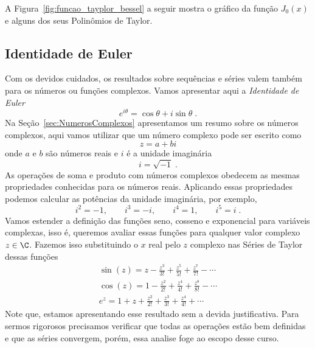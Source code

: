 A Figura~\ref{fig:funcao_tayplor_bessel} a seguir
mostra o gráfico da função $J_0(x)$ e alguns dos seus Polinômios de Taylor.

\subsection{Identidade de Euler}

Com os devidos cuidados, os resultados sobre sequências e séries
valem também para os números ou funções complexos. Vamos apresentar aqui a
\emph{Identidade de Euler}
\[
  e^{i\theta} = \cos\theta + i\sin\theta   \;.
\]
Na Seção~\ref{sec:NumerosComplexos} apresentamos um resumo sobre os
números complexos, aqui vamos utilizar que um número complexo
pode ser escrito como
\[
  z = a + bi
\]
onde $a$ e $b$ são números reais e $i$ é a unidade imaginária
\[
  i = \sqrt{-1}   \;.
\]
As operações de soma e produto com números complexos obedecem as mesmas
propriedades conhecidas para os números reais. Aplicando essas propriedades
podemos calcular as potências da unidade imaginária, por exemplo,
\[
  i^2 = -1, \qquad i^3 = -i, \qquad i^4 = 1, \qquad i^5 = i   \;.
\]
Vamos estender a definição das funções seno, cosseno e exponencial
para variáveis complexas, isso é, queremos avaliar essas funções para qualquer
valor complexo $z\in\C$. Fazemos isso substituindo o $x$ real pelo $z$ complexo
nas Séries de Taylor dessas funções
\begin{gather*}
  \sin(z) = z - \frac{z^3}{3!} + \frac{z^5}{5!} + \frac{z^7}{7!} - \cdots \\[3mm]
  \cos(z) = 1 - \frac{z^2}{2!} + \frac{z^4}{4!} + \frac{z^8}{8!} - \cdots \\[3mm]
  e^z = 1 + z + \frac{z^2}{2!} + \frac{z^3}{3!} + \frac{z^4}{4!} +  \cdots
\end{gather*}
Note que, estamos apresentando esse resultado sem a devida justificativa.
Para sermos rigorosos precisamos verificar que todas as operações estão bem
definidas e que as séries convergem, porém, essa analise foge ao escopo desse curso.

